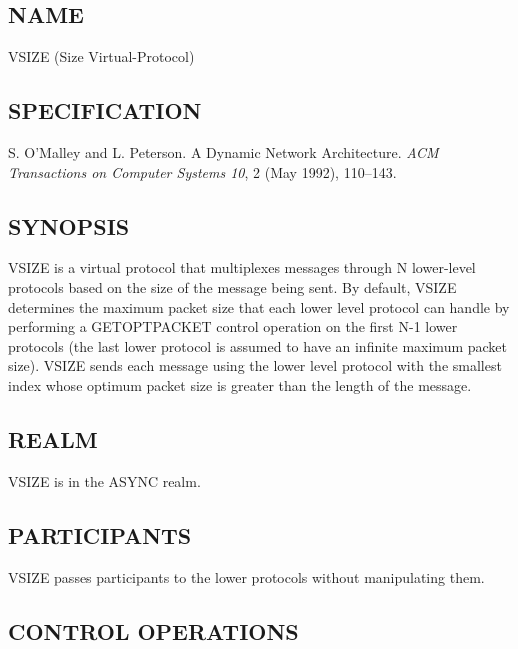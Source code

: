 %     
%
%
%
%
%


\subsection*{NAME}

\noindent VSIZE (Size Virtual-Protocol)

\subsection*{SPECIFICATION}

\noindent 
S. O'Malley and L. Peterson.  A Dynamic Network Architecture.  {\it
ACM Transactions on Computer Systems 10}, 2 (May 1992), 110--143.

\subsection*{SYNOPSIS}

\noindent VSIZE is a virtual protocol that multiplexes messages
through N lower-level protocols based on the size of the message
being sent.  By default, VSIZE determines the maximum packet size that 
each lower level protocol can handle by performing a GETOPTPACKET 
control operation on the first N-1 lower protocols (the last lower 
protocol is assumed to have an infinite maximum packet size). 
VSIZE sends each message using the lower level protocol with the
smallest index
whose optimum packet size is greater than the length of the 
message. 
 
\subsection*{REALM}

VSIZE is in the ASYNC realm.

\subsection*{PARTICIPANTS}

VSIZE passes participants to the lower protocols without manipulating
them. 

\subsection*{CONTROL OPERATIONS}

